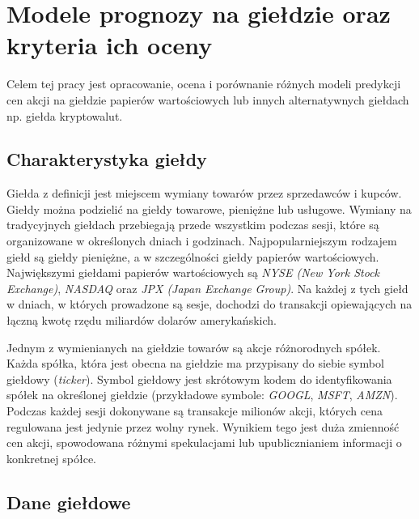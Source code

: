 \documentclass[a4paper, twoside, 11pt, openright]{article}
\newcommand{\fncymain}{%
	\fancyhead[RO]{{\footnotesize \rightmark}}
	\fancyfoot[RO]{\thepage}
	\fancyhead[LE]{{\footnotesize \leftmark}}
	\fancyfoot[LE]{\thepage}
	\fancyfoot[C]{}
	\renewcommand{\headrulewidth}{0.3pt}}
\begin{document}
\fncymain



\cleardoublepage

\tableofcontents

\cleardoublepage

\section{Modele prognozy na giełdzie oraz kryteria ich oceny}

Celem tej pracy jest opracowanie, ocena i porównanie różnych modeli predykcji cen akcji na giełdzie papierów wartościowych lub innych alternatywnych giełdach np. giełda kryptowalut.

\subsection{Charakterystyka giełdy}

Giełda z definicji jest miejscem wymiany towarów przez sprzedawców i kupców. Giełdy można podzielić na giełdy towarowe, pieniężne lub usługowe. Wymiany na tradycyjnych giełdach przebiegają przede wszystkim podczas sesji, które są organizowane w określonych dniach i godzinach. Najpopularniejszym rodzajem giełd są giełdy pieniężne, a w szczególności giełdy papierów wartościowych. Największymi giełdami papierów wartościowych są \textit{NYSE (New York Stock Exchange)}\cite{nyse}, \textit{NASDAQ}\cite{nasdaq} oraz \textit{JPX (Japan Exchange Group)}\cite{jpx}. Na każdej z tych giełd w dniach, w których prowadzone są sesje, dochodzi do transakcji opiewających na łączną kwotę rzędu miliardów dolarów amerykańskich.

\bigskip

 Jednym z wymienianych na giełdzie towarów są akcje różnorodnych spółek. Każda spółka, która jest obecna na giełdzie ma przypisany do siebie symbol giełdowy (\textit{ticker}). Symbol giełdowy jest skrótowym kodem do identyfikowania spółek na określonej giełdzie (przykładowe symbole: \textit{GOOGL}, \textit{MSFT}, \textit{AMZN}). Podczas każdej sesji dokonywane są transakcje milionów akcji, których cena regulowana jest jedynie przez wolny rynek. Wynikiem tego jest duża zmienność cen akcji, spowodowana różnymi spekulacjami lub upublicznianiem informacji o konkretnej spółce.


\subsection{Dane giełdowe}
\end{document}
